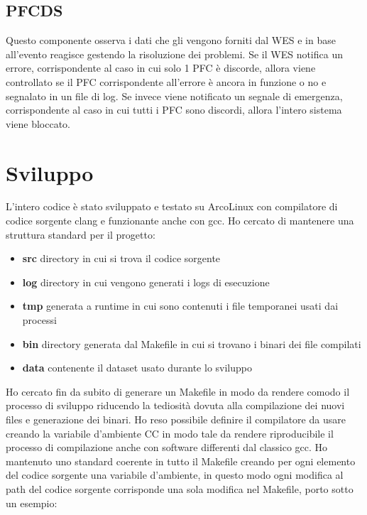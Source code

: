 \documentclass{article}
\begin{document}
\begin{flushleft}
\subsection{PFCDS}

Questo componente osserva i dati che gli vengono forniti dal WES e in base all'evento reagisce gestendo la risoluzione dei problemi. Se il WES notifica un errore, corrispondente al caso in cui solo 1 PFC è discorde, allora viene controllato se il PFC corrispondente all'errore è ancora in funzione o no e segnalato in un file di log. Se invece viene notificato un segnale di emergenza, corrispondente al caso in cui tutti i PFC sono discordi, allora l'intero sistema viene bloccato.

\section{Sviluppo}

L'intero codice è stato sviluppato e testato su ArcoLinux con compilatore di codice sorgente clang e funzionante anche con gcc. Ho cercato di mantenere una struttura standard per il progetto:

\begin{itemize}
    \item \textbf{src} directory in cui si trova il codice sorgente
    \item \textbf{log} directory in cui vengono generati i logs di esecuzione
    \item \textbf{tmp} generata a runtime in cui sono contenuti i file temporanei usati dai processi
    \item \textbf{bin} directory generata dal Makefile in cui si trovano i binari dei file compilati
    \item \textbf{data} contenente il dataset usato durante lo sviluppo
\end{itemize}

Ho cercato fin da subito di generare un Makefile in modo da rendere comodo il processo di sviluppo riducendo la tediosità dovuta alla compilazione dei nuovi files e generazione dei binari. Ho reso possibile definire il compilatore da usare creando la variabile d'ambiente CC in modo tale da rendere riproducibile il processo di compilazione anche con software differenti dal classico gcc. Ho mantenuto uno standard coerente in tutto il Makefile creando per ogni elemento del codice sorgente una variabile d'ambiente, in questo modo ogni modifica al path del codice sorgente corrisponde una sola modifica nel Makefile, porto sotto un esempio:


\end{flushleft}
\end{document}
